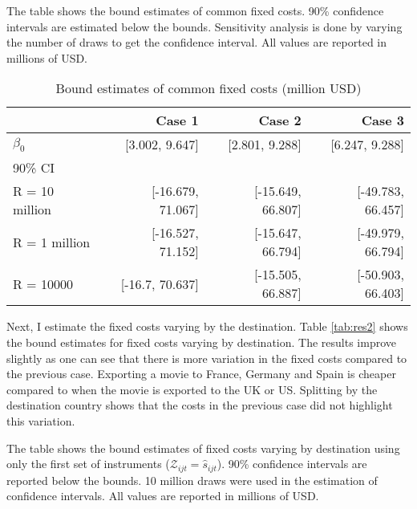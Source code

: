 \documentclass[11pt, letterpaper]{article} \usepackage{amsmath}
\newcommand{\floatintro}[1]{
  
  \vspace*{0.1in}
  
  {\footnotesize

    #1
    
  }
  
  \vspace*{0.1in} } \newcommand{\Hline}{\noindent\rule{18cm}{0.5pt}}
\begin{document}
\begin{table}[htbp!]
  \floatintro{The table shows the bound estimates of common fixed
    costs. 90\% confidence intervals are estimated below the
    bounds. Sensitivity analysis is done by varying the number of
    draws to get the confidence interval. All values are reported in
    millions of USD.}
  \centering
  \begin{tabular}{lrrr}
    \hline
    & Case 1 & Case 2 & Case 3 \\
    \hline
    $\beta_0$ & {[}3.002, 9.647{]} & {[}2.801, 9.288{]} & {[}6.247, 9.288{]} \\
    90\% CI &  &  &  \\
    R = 10 million & {[}-16.679, 71.067{]} & {[}-15.649, 66.807{]} & {[}-49.783, 66.457{]} \\
    R = 1 million & {[}-16.527, 71.152{]} & {[}-15.647, 66.794{]} & {[}-49.979, 66.794{]} \\
    R = 10000 & {[}-16.7, 70.637{]} & {[}-15.505, 66.887{]} &
                                                              {[}-50.903, 66.403{]}\\
    \hline
  \end{tabular}
  \caption{Bound estimates of common fixed costs (million USD)}
  \label{tab:res1}
\end{table}
Next, I estimate the fixed costs varying by the destination. Table
\ref{tab:res2} shows the bound estimates for fixed costs varying by
destination. The results improve slightly as one can see that there is
more variation in the fixed costs compared to the previous
case. Exporting a movie to France, Germany and Spain is cheaper
compared to when the movie is exported to the UK or US. Splitting by
the destination country shows that the costs in the previous case did
not highlight this variation.
\begin{table}[htbp!]
  \floatintro{The table shows the bound estimates of fixed costs
    varying by destination using only the first set of instruments
    ($\mathcal{Z}_{ijt} = \hat s_{ijt}$). 90\% confidence intervals are reported
    below the bounds. 10 million draws were used in the estimation of
    confidence intervals. All values are
    reported in millions of USD.}
  \centering
  \caption{Bound estimates of fixed costs varying by destination
    (million USD)}
  \label{tab:res2}
\end{table}
\end{document}
